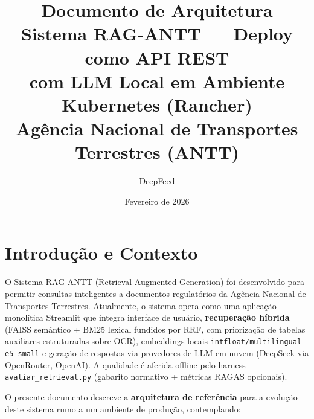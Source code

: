 \documentclass[12pt, a4paper]{article}
\title{%
  \vspace{-1cm}
  \textbf{Documento de Arquitetura}\\[0.5cm]
  \Large Sistema RAG-ANTT --- Deploy como API REST\\
  com LLM Local em Ambiente Kubernetes (Rancher)\\[0.3cm]
  \large Agência Nacional de Transportes Terrestres (ANTT)
}
\author{%
  DeepFeed\\
}
\date{Fevereiro de 2026}
\begin{document}
\maketitle
\thispagestyle{empty}

\vspace{1cm}

\begin{center}
\end{center}

\newpage
\tableofcontents
\newpage

\section{Introdução e Contexto}

O Sistema RAG-ANTT (Retrieval-Augmented Generation) foi desenvolvido para permitir consultas inteligentes a documentos regulatórios da Agência Nacional de Transportes Terrestres. Atualmente, o sistema opera como uma aplicação monolítica Streamlit que integra interface de usuário, \textbf{recuperação híbrida} (FAISS semântico + BM25 lexical fundidos por RRF, com priorização de tabelas auxiliares estruturadas sobre OCR), embeddings locais \texttt{intfloat/multilingual-e5-small} e geração de respostas via provedores de LLM em nuvem (DeepSeek via OpenRouter, OpenAI). A qualidade é aferida offline pelo harness \texttt{avaliar\_retrieval.py} (gabarito normativo + métricas RAGAS opcionais).

O presente documento descreve a \textbf{arquitetura de referência} para a evolução deste sistema rumo a um ambiente de produção, contemplando:
\end{document}
